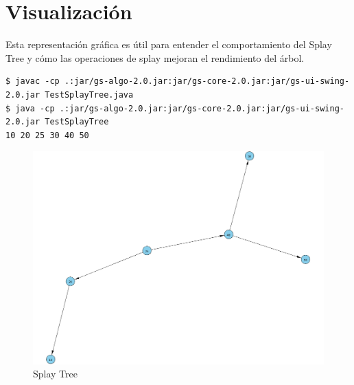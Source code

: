\section{Visualización}
Esta representación gráfica es útil para entender el comportamiento del Splay Tree y cómo las operaciones de splay mejoran el rendimiento del árbol.

\begin{verbatim}
$ javac -cp .:jar/gs-algo-2.0.jar:jar/gs-core-2.0.jar:jar/gs-ui-swing-2.0.jar TestSplayTree.java
$ java -cp .:jar/gs-algo-2.0.jar:jar/gs-core-2.0.jar:jar/gs-ui-swing-2.0.jar TestSplayTree
10 20 25 30 40 50
\end{verbatim}

\begin{figure}[H]
  \centering
  \includegraphics[width=1.0\textwidth]{img/representation_splayTree.png}
  \caption{Splay Tree}
\end{figure}

